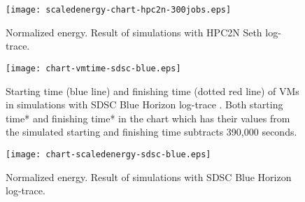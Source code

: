 \begin{figure}[!ht]
\centering
\texttt{[image: scaledenergy-chart-hpc2n-300jobs.eps]}
\caption{Normalized energy. Result of simulations with HPC2N Seth log-trace.}
    \label{fig:scaledenergyresult-hpc2n}
\end{figure}

\begin{figure}[!ht]
    \centering
    \texttt{[image: chart-vmtime-sdsc-blue.eps]}
    \caption[Starting time of VMs]{Starting time (blue line) and finishing time (dotted red line) of VMs in simulations with SDSC Blue Horizon log-trace \cite{SDSCBLUEWorkload}. Both starting time* and finishing time* in the chart which has their values from the simulated starting and finishing time subtracts 390,000 seconds.}
    \label{fig:vmtime-sdscblue}
\end{figure}





\begin{figure}[!ht]
\centering
\texttt{[image: chart-scaledenergy-sdsc-blue.eps]}
\caption{Normalized energy. Result of simulations with SDSC Blue Horizon log-trace.}
    \label{fig:chart-scaledenergy-sdsc-blue}
\end{figure}

